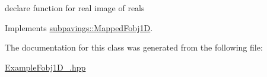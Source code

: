 declare function for real image of reals 



\-Implements \hyperlink{classsubpavings_1_1MappedFobj1D_abee3fbd4c06d7d2f6e276f31d485eb7c}{subpavings\-::\-Mapped\-Fobj1\-D}.



\-The documentation for this class was generated from the following file\-:\begin{DoxyCompactItemize}
\item 
\hyperlink{ExampleFobj1D__1_8hpp}{\-Example\-Fobj1\-D\-\_.\-hpp}\end{DoxyCompactItemize}
